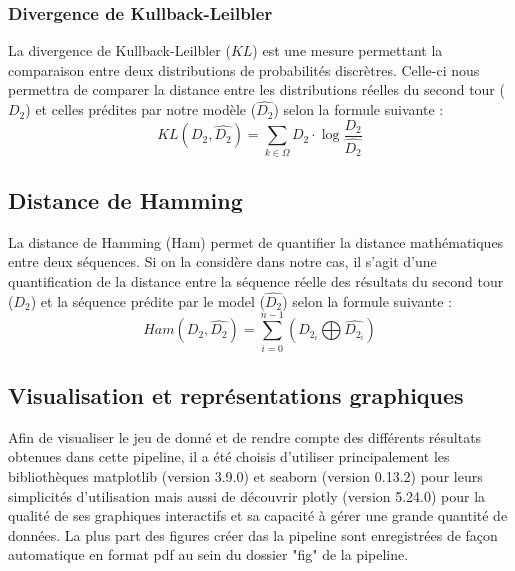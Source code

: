\documentclass[11pt]{article}
\begin{document}
            \subsubsection*{Divergence de Kullback-Leilbler}
                La divergence de Kullback-Leilbler \cite{Kullback_Leibler_1951} ($KL$) est une mesure permettant la comparaison entre deux distributions de probabilités discrètres. Celle-ci nous permettra de comparer la distance entre les distributions réelles du second tour ($D_2$) et celles prédites par notre modèle ($\hat{D_2}$) selon la formule suivante :
                \begin{equation}
                    KL(D_2,\hat{D_2}) = \sum_{k \in \Omega} D_2 \cdot \log \frac{D_2}{\hat{D_2}}
                \end{equation}

            \subsection*{Distance de Hamming}
                La distance de Hamming (Ham) permet de quantifier la distance mathématiques entre deux séquences. Si on la considère dans notre cas, il s'agit d'une quantification de la distance entre la séquence réelle des résultats du second tour ($D_2$) et la séquence prédite par le model ($\hat{D_2}$) selon la formule suivante :
                \begin{equation}
                    Ham(D_2, \hat{D_2}) = \sum_{i=0}^{n-1}(D_2_i \bigoplus \hat{D_2_i})
                \end{equation}

        \subsection*{Visualisation et représentations graphiques}
            Afin de visualiser le jeu de donné et de rendre compte des différents résultats obtenues dans cette pipeline, il a été choisis d'utiliser principalement les bibliothèques matplotlib (version 3.9.0) et seaborn (version 0.13.2) pour leurs simplicités d'utilisation mais aussi de découvrir plotly (version 5.24.0) pour la qualité de ses graphiques interactifs et sa capacité à gérer une grande quantité de données. La plus part des figures créer das la pipeline sont enregistrées de façon automatique en format pdf au sein du dossier "fig" de la pipeline.
            
\end{document}
